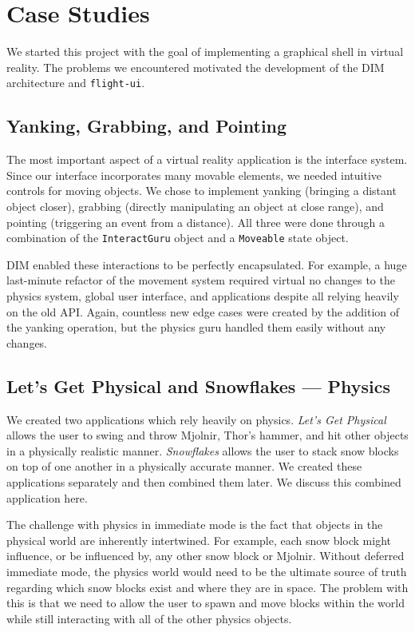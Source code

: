 \documentclass[conference,12pt]{IEEEtran}
\begin{document}
\section{Case Studies}\label{sec:case-studies}

We started this project with the goal of implementing a graphical shell in
virtual reality. The problems we encountered motivated the development of the
DIM architecture and \texttt{flight-ui}.

\subsection{Yanking, Grabbing, and Pointing}

The most important aspect of a virtual reality application is the interface
system. Since our interface incorporates many movable elements, we needed
intuitive controls for moving objects. We chose to implement yanking (bringing a
distant object closer), grabbing (directly manipulating an object at close
range), and pointing (triggering an event from a distance). All three were done
through a combination of the \texttt{InteractGuru} object and a
\texttt{Moveable} state object.

DIM enabled these interactions to be perfectly encapsulated. For example, a huge
last-minute refactor of the movement system required virtual no changes to the
physics system, global user interface, and applications despite all relying
heavily on the old API. Again, countless new edge cases were created by the
addition of the yanking operation, but the physics guru handled them easily
without any changes.

\subsection{Let's Get Physical and Snowflakes --- Physics}
We created two applications which rely heavily on physics. \textit{Let's Get
Physical} allows the user to swing and throw Mjolnir, Thor's hammer, and hit
other objects in a physically realistic manner. \textit{Snowflakes} allows the
user to stack snow blocks on top of one another in a physically accurate manner.
We created these applications separately and then combined them later. We
discuss this combined application here.

The challenge with physics in immediate mode is the fact that objects in the
physical world are inherently intertwined. For example, each snow block might
influence, or be influenced by, any other snow block or Mjolnir. Without
deferred immediate mode, the physics world would need to be the ultimate source
of truth regarding which snow blocks exist and where they are in space. The
problem with this is that we need to allow the user to spawn and move blocks
within the world while still interacting with all of the other physics objects.
\end{document}
